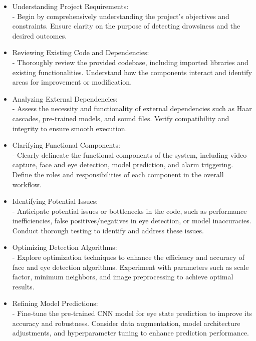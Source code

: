 \documentclass[12pt]{article}
\begin{document}
\begin{itemize}
\item Understanding Project Requirements:\\ - Begin by comprehensively understanding the project's objectives and constraints. Ensure clarity on the purpose of detecting drowsiness and the desired outcomes.

\item Reviewing Existing Code and Dependencies:\\ - Thoroughly review the provided codebase, including imported libraries and existing functionalities. Understand how the components interact and identify areas for improvement or modification.

\item Analyzing External Dependencies:\\ - Assess the necessity and functionality of external dependencies such as Haar cascades, pre-trained models, and sound files. Verify compatibility and integrity to ensure smooth execution.

\item Clarifying Functional Components:\\ - Clearly delineate the functional components of the system, including video capture, face and eye detection, model prediction, and alarm triggering. Define the roles and responsibilities of each component in the overall workflow.

\item Identifying Potential Issues:\\- Anticipate potential issues or bottlenecks in the code, such as performance inefficiencies, false positives/negatives in eye detection, or model inaccuracies. Conduct thorough testing to identify and address these issues.

\item Optimizing Detection Algorithms:\\ - Explore optimization techniques to enhance the efficiency and accuracy of face and eye detection algorithms. Experiment with parameters such as scale factor, minimum neighbors, and image preprocessing to achieve optimal results.

\item Refining Model Predictions:\\ - Fine-tune the pre-trained CNN model for eye state prediction to improve its accuracy and robustness. Consider data augmentation, model architecture adjustments, and hyperparameter tuning to enhance prediction performance.


\end{itemize}
\end{document}
